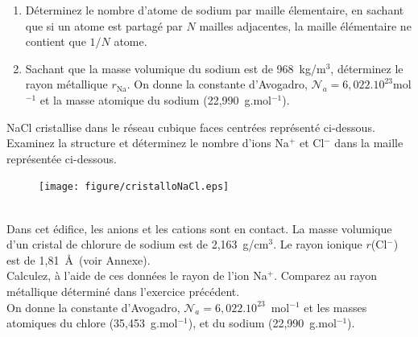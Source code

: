 \begin{enumerate}[\bf 1)]
\item D\'eterminez le nombre d'atome de sodium par maille \'elementaire, en sachant que si un atome est partag\'e par $N$ mailles adjacentes, la maille \'el\'ementaire ne contient que $1/N$ atome.
\item Sachant que la masse volumique du sodium est de 968~kg/m$^3$, d\'eterminez le rayon m\'etallique $r_\textrm{Na}$.
On donne la constante d'Avogadro, $\mathcal{N}_a=6,022.10^{23}$mol$^{-1}$ et la masse atomique du sodium (22,990~g.mol$^{-1}$).
\end{enumerate}
NaCl cristallise dans le r\'eseau cubique faces centr\'ees repr\'esent\'e ci-dessous.\\
Examinez la structure et d\'eterminez le nombre d'ions Na$^+$ et Cl$^-$ dans la maille repr\'esent\'ee ci-dessous.
\begin{figure}[!h]
\begin{center}
\texttt{[image: figure/cristalloNaCl.eps]}
\end{center}
\end{figure}
\\Dans cet \'edifice, les anions et les cations sont en contact. 
La masse volumique d'un cristal de chlorure de sodium est de 2,163~g/cm$^3$. Le rayon ionique $r$(Cl$^-$) est de 1,81~\AA\ (voir Annexe).\\
Calculez, \`a l'aide de ces donn\'ees le rayon de l'ion Na$^+$. Comparez au rayon m\'etallique d\'etermin\'e dans l'exercice pr\'ec\'edent.\\
On donne la constante d'Avogadro, $\mathcal{N}_a=6,022.10^{23}$~mol$^{-1}$ et les masses atomiques du chlore (35,453~g.mol$^{-1}$), et du sodium (22,990~g.mol$^{-1}$).
%
